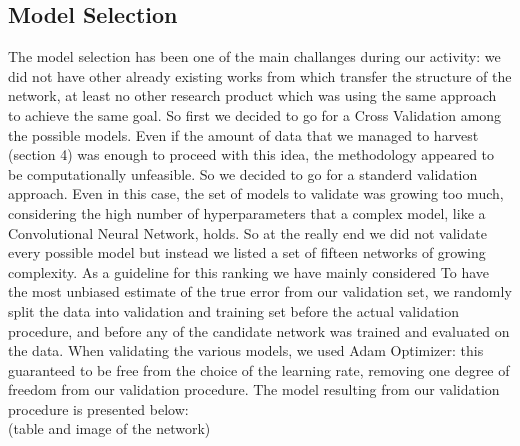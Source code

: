 \subsection{Model Selection}
The model selection has been one of the main challanges during our activity: we did not have other already existing works from which transfer the structure of the network, at least no other research product which was using the same approach to achieve the same goal. So first we decided to go for a Cross Validation among the possible models. Even if the amount of data that we managed to harvest (section 4) was enough to proceed with this idea, the methodology appeared to be computationally unfeasible. So we decided to go for a standerd validation approach. Even in this case, the set of models to validate was growing too much, considering the high number of hyperparameters that a complex model, like a Convolutional Neural Network, holds. So at the really end we did not validate every possible model but instead we listed a set of fifteen networks of growing complexity. As a guideline for this ranking we have mainly considered 
To have the most unbiased estimate of the true error from our validation set, we randomly split the data into validation and training set before the actual validation procedure, and before any of the candidate network was trained and evaluated on the data.
When validating the various models, we used Adam Optimizer: this guaranteed to be free from the choice of the learning rate, removing one degree of freedom from our validation procedure.
The model resulting from our validation procedure is presented below:\\

(table and image of the network)\\


%

